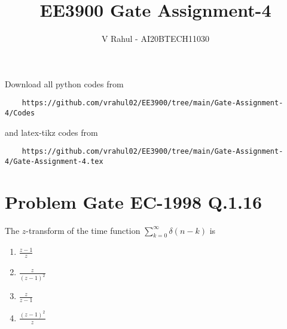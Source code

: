 \documentclass[journal,12pt,twocolumn]{IEEEtran}
\begin{document}
\title{EE3900 Gate Assignment-4}
\author{V Rahul - AI20BTECH11030}
\maketitle
\newpage
\bigskip
\renewcommand{\thefigure}{\theenumi}
\renewcommand{\thetable}{\theenumi}
Download all python codes from 
\begin{lstlisting}
    https://github.com/vrahul02/EE3900/tree/main/Gate-Assignment-4/Codes
\end{lstlisting}
%
and latex-tikz codes from 
%
\begin{lstlisting}
    https://github.com/vrahul02/EE3900/tree/main/Gate-Assignment-4/Gate-Assignment-4.tex
\end{lstlisting}
\section*{Problem Gate EC-1998 Q.1.16}
The $z$-transform of the time function
$\sum_{k=0}^{\infty} \delta (n-k)$ is\\
\begin{enumerate}
    \item $\frac{z-1}{z}$
    \item $\frac{z}{(z-1)^2}$
    \item $\frac{z}{z-1}$
    \item $\frac{(z-1)^2}{z}$
\end{enumerate}
\end{document}
